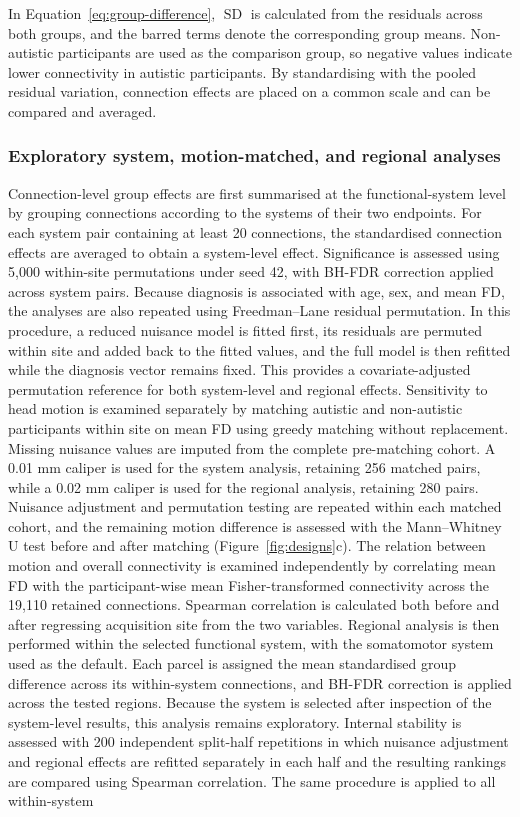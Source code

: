 In Equation~\eqref{eq:group-difference}, $\operatorname{SD}$ is calculated from the residuals across both groups, and the barred terms denote the corresponding group means. Non-autistic participants are used as the comparison group, so negative values indicate lower connectivity in autistic participants. By standardising with the pooled residual variation, connection effects are placed on a common scale and can be compared and averaged.


\subsubsection{Exploratory system, motion-matched, and regional analyses}
\label{subsubsec:system-motion-regional}

Connection-level group effects are first summarised at the functional-system level by grouping connections according to the systems of their two endpoints. For each system pair containing at least 20 connections, the standardised connection effects are averaged to obtain a system-level effect. Significance is assessed using 5,000 within-site permutations under seed 42, with BH-FDR correction applied across system pairs. Because diagnosis is associated with age, sex, and mean FD, the analyses are also repeated using Freedman--Lane residual permutation. In this procedure, a reduced nuisance model is fitted first, its residuals are permuted within site and added back to the fitted values, and the full model is then refitted while the diagnosis vector remains fixed. This provides a covariate-adjusted permutation reference for both system-level and regional effects. Sensitivity to head motion is examined separately by matching autistic and non-autistic participants within site on mean FD using greedy matching without replacement. Missing nuisance values are imputed from the complete pre-matching cohort. A 0.01 mm caliper is used for the system analysis, retaining 256 matched pairs, while a 0.02 mm caliper is used for the regional analysis, retaining 280 pairs. Nuisance adjustment and permutation testing are repeated within each matched cohort, and the remaining motion difference is assessed with the Mann--Whitney U test before and after matching (Figure~\ref{fig:designs}c). The relation between motion and overall connectivity is examined independently by correlating mean FD with the participant-wise mean Fisher-transformed connectivity across the 19,110 retained connections. Spearman correlation is calculated both before and after regressing acquisition site from the two variables. Regional analysis is then performed within the selected functional system, with the somatomotor system used as the default. Each parcel is assigned the mean standardised group difference across its within-system connections, and BH-FDR correction is applied across the tested regions. Because the system is selected after inspection of the system-level results, this analysis remains exploratory. Internal stability is assessed with 200 independent split-half repetitions in which nuisance adjustment and regional effects are refitted separately in each half and the resulting rankings are compared using Spearman correlation. The same procedure is applied to all within-system 